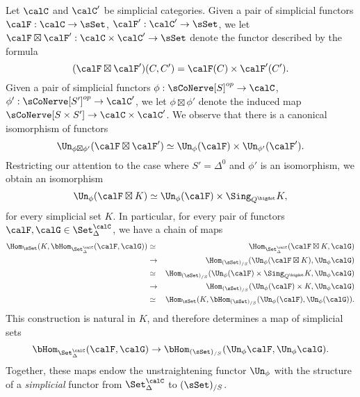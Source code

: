 \begin{remark}\label{simfun}
Let $\calC$ and $\calC'$ be simplicial categories. Given a pair of simplicial functors
$\calF: \calC \rightarrow \sSet$, $\calF': \calC' \rightarrow \sSet$, we let $\calF \boxtimes \calF': \calC \times \calC' \rightarrow \sSet$ denote the functor described by the formula
$$(\calF \boxtimes \calF')(C,C') = \calF(C) \times \calF'(C').$$
Given a pair of simplicial functors $\phi: \sCoNerve[S]^{op} \rightarrow \calC$, $\phi': \sCoNerve[S']^{op} \rightarrow \calC'$, we let $\phi \boxtimes \phi'$ denote the induced map
$\sCoNerve[S \times S'] \rightarrow \calC \times \calC'$. We observe that there is a canonical isomorphism of functors
$$ \Un_{\phi \boxtimes \phi'}( \calF \boxtimes \calF') \simeq \Un_{\phi}(\calF) \times \Un_{\phi'}(\calF').$$
Restricting our attention to the case where $S' = \Delta^0$ and $\phi'$ is an isomorphism,
we obtain an isomorphism
$$ \Un_{\phi}( \calF \boxtimes K) \simeq \Un_{\phi}(\calF) \times \Sing_{Q^{\bigdot}} K,$$
for every simplicial set $K$. In particular, for every pair of functors
$\calF, \calG \in \Set_{\Delta}^{\calC}$, we have a chain of maps
\begin{eqnarray*}
\Hom_{\sSet}(K, \bHom_{ \Set^{\calC}_{\Delta}}( \calF, \calG) )
& \simeq & \Hom_{ \Set^{\calC}_{\Delta}}( \calF \boxtimes K, \calG ) \\
& \rightarrow & \Hom_{ (\sSet)_{/S} }( \Un_{\phi}( \calF \boxtimes K), \Un_{\phi} \calG ) \\
& \simeq & \Hom_{ (\sSet)_{/S} }( \Un_{\phi}(\calF) \times \Sing_{Q^{\bigdot}} K, \Un_{\phi} \calG) \\
& \rightarrow & \Hom_{ (\sSet)_{/S} }( \Un_{\phi}(\calF) \times K, \Un_{\phi} \calG) \\
& \simeq & \Hom_{\sSet}(K, \bHom_{ (\sSet)_{/S}}( \Un_{\phi}(\calF), \Un_{\phi}(\calG) ).
\end{eqnarray*}
This construction is natural in $K$, and therefore determines a map of simplicial sets
$$ \bHom_{ \Set^{\calC}_{\Delta}}(\calF, \calG) \rightarrow
\bHom_{ (\sSet)_{/S}}( \Un_{\phi} \calF, \Un_{\phi} \calG ).$$
Together, these maps endow the unstraightening functor
$\Un_{\phi}$ with the structure of a {\em simplicial} functor from
$\Set^{\calC}_{\Delta}$ to $(\sSet)_{/S}$. 
\end{remark}

